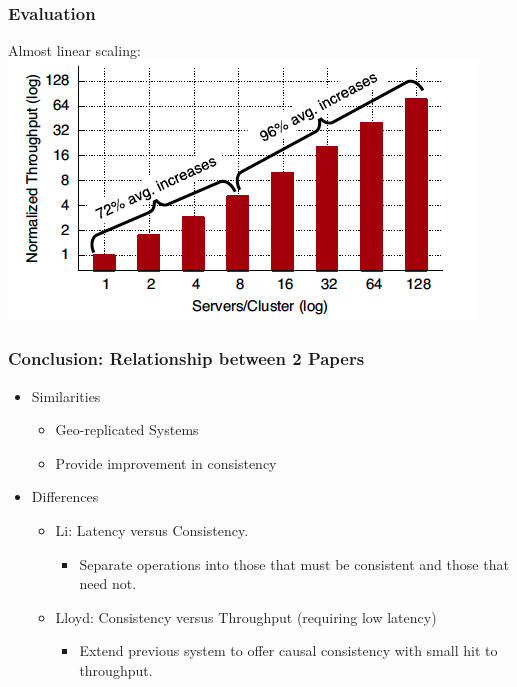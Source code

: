 \documentclass{beamer}
\begin{document}
\begin{frame}
\frametitle{Evaluation}
Almost linear scaling:
\includegraphics[scale=0.6]{Figure_Almost_Linear.png}  
\end{frame}







\begin{frame}
\frametitle{Conclusion: Relationship between 2 Papers}
\begin{itemize}
\item Similarities
	\begin{itemize}
		\item Geo-replicated Systems
		\item Provide improvement in consistency
	\end{itemize}
\item Differences
	\begin{itemize}
		\item Li: Latency versus Consistency.
			\begin{itemize}
				\item Separate operations into those that must be consistent and those that need not.
			\end{itemize}
		\item Lloyd: Consistency versus Throughput (requiring low latency)
			\begin{itemize}
				\item Extend previous system to offer causal consistency with small hit to throughput.
			\end{itemize}
	\end{itemize}

\end{itemize}  
\end{frame}
\end{document}
